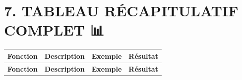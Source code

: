 \documentclass[12pt,a4paper]{article}
\begin{document}
	\newpage
	\section*{\color{rouge}7. TABLEAU RÉCAPITULATIF COMPLET 📊}
	
	\begin{longtable}{|>{\ttfamily}m{2.5cm}|m{3cm}|>{\ttfamily}m{4cm}|m{2.5cm}|}
		\hline
		\rowcolor{bleu}
		\color{white}\textbf{Fonction} & \color{white}\textbf{Description} & \color{white}\textbf{Exemple} & \color{white}\textbf{Résultat} \\
		\hline
		\endfirsthead
		
		\hline
		\rowcolor{bleu}
		\color{white}\textbf{Fonction} & \color{white}\textbf{Description} & \color{white}\textbf{Exemple} & \color{white}\textbf{Résultat} \\
		\hline
		\endhead
		

\end{longtable}
\end{document}
